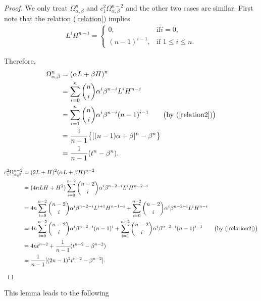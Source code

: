\documentclass[11pt]{amsart}
\theoremstyle{definition}
\theoremstyle{remark}
\numberwithin{equation}{section}
\begin{document}
\begin{proof}
We only treat $\Omega_{\alpha,\beta}^n$ and
$c_1^2\Omega_{\alpha,\beta}^{n-2}$ and the other two cases are
similar. First note that the relation (\ref{relation}) implies
\begin{eqnarray}\label{relation2}
L^iH^{n-i}= \left\{ \begin{array}{ll} 0, & \text{if
$i=0$},\\
(n-1)^{i-1}, & \text{if $1\leq i\leq n$}.
\end{array} \right.
\end{eqnarray}

Therefore,
\begin{equation}\begin{split} \Omega_{\alpha,\beta}^n&=(\alpha L+\beta H)^n\\
&=\sum_{i=0}^n\binom{n}{i}\alpha^i\beta^{n-i}L^iH^{n-i}\\
&=\sum_{i=1}^n\binom{n}{i}\alpha^i\beta^{n-i}(n-1)^{i-1}\qquad\big(\text{by
(\ref{relation2})}\big)\\
&=\frac{1}{n-1}\big\{[(n-1)\alpha+\beta]^n-\beta^n\big\}\\
&=\frac{1}{n-1}(t^n-\beta^n).
\end{split}\nonumber\end{equation}

\begin{equation}\begin{split} c_1^2\Omega_{\alpha,\beta}^{n-2}&=
(2L+H)^2(\alpha L+\beta H)^{n-2}\\
&=(4nLH+H^2)\sum_{i=0}^{n-2}\binom{n-2}{i}
\alpha^i\beta^{n-2-i}L^iH^{n-2-i}\\
&=4n\sum_{i=0}^{n-2}\binom{n-2}{i}
\alpha^i\beta^{n-2-i}L^{i+1}H^{n-1-i}+
\sum_{i=0}^{n-2}\binom{n-2}{i}
\alpha^i\beta^{n-2-i}L^iH^{n-i}\\
&=4n\sum_{i=0}^{n-2}\binom{n-2}{i}
\alpha^i\beta^{n-2-i}(n-1)^i+\sum_{i=1}^{n-2}\binom{n-2}{i}
\alpha^i\beta^{n-2-i}(n-1)^{i-1}\qquad\big(\text{by
(\ref{relation2})}\big)\\
&=4nt^{n-2}+\frac{1}{n-1}(t^{n-2}-\beta^{n-2})\\
&=\frac{1}{n-1}[(2n-1)^2t^{n-2}-\beta^{n-2}].
\end{split}\nonumber\end{equation}
\end{proof}

This lemma leads to the following
\end{document}
